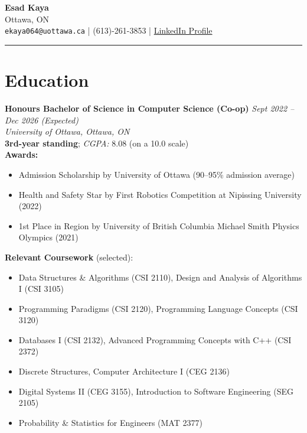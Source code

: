 \documentclass[11pt]{article}
\begin{document}
\begin{center}
    {\Huge \textbf{Esad Kaya}}\\
    \vspace{5pt}
    Ottawa, ON \\
    \texttt{ekaya064@uottawa.ca} \quad | \quad (613)-261-3853 \quad | \quad
    \href{https://www.linkedin.com/in/esad-kaya-28b400215/}{LinkedIn Profile}
\end{center}

\hrule
\vspace{-0.4em}

\section*{Education}
\noindent
\textbf{Honours Bachelor of Science in Computer Science (Co-op)} \hfill \textit{Sept 2022 -- Dec 2026 (Expected)} \\
\textit{University of Ottawa, Ottawa, ON} \\
\textbf{3rd-year standing}; \textit{CGPA:} 8.08 (on a 10.0 scale) \\
\textbf{Awards:} 
\begin{itemize}
    \item Admission Scholarship by University of Ottawa (90--95\% admission average)
    \item Health and Safety Star by First Robotics Competition at Nipissing University (2022)
    \item 1st Place in Region by University of British Columbia Michael Smith Physics Olympics (2021)
\end{itemize}
\textbf{Relevant Coursework} (selected):
\begin{itemize}
    \item Data Structures \& Algorithms (CSI 2110), Design and Analysis of Algorithms I (CSI 3105)
    \item Programming Paradigms (CSI 2120), Programming Language Concepts (CSI 3120)
    \item Databases I (CSI 2132), Advanced Programming Concepts with C++ (CSI 2372)
    \item Discrete Structures, Computer Architecture I (CEG 2136)
    \item Digital Systems II (CEG 3155), Introduction to Software Engineering (SEG 2105)
    \item Probability \& Statistics for Engineers (MAT 2377)
\end{itemize}
\end{document}
